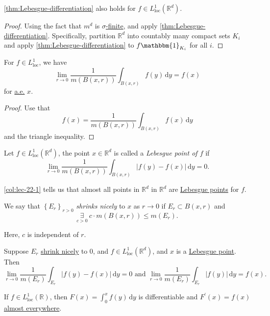 \begin{corollary}\label{col:lec-22-1}
	\autoref{thm:Lebesgue-differentiation} also holds for \(f\in L^1_{\text{loc}}(\mathbb{R} ^d)\).
\end{corollary}
\begin{proof}
	Using the fact that \(m^d\) is \hyperref[def:finite-measure]{\(\sigma \)-finite}, and apply \autoref{thm:Lebesgue-differentiation}.
	Specifically, partition \(\mathbb{R} ^d\) into countably many compact sets \(K_{i} \) and apply \autoref{thm:Lebesgue-differentiation}
	to \(f\mathbbm{1}_{K_{i} } \) for all \(i\).
\end{proof}

\begin{corollary}\label{col:lec-22-2}
	For \(f\in L^1_{\text{loc} }\), we have
	\[
		\lim_{r \to 0} \frac{1}{m(B(x, r))}\int_{B(x, r)}^{} f(y) \,\mathrm{d}y = f(x)
	\]
	for \hyperref[def:mu-almost-everywhere]{a.e.} \(x\).
\end{corollary}
\begin{proof}
	Use that
	\[
		f(x) = \frac{1}{m(B(x, r))}\int _{B(x, r)} f(x)\,\mathrm{d} y
	\]
	and the triangle inequality.
\end{proof}

\begin{definition}\label{def:Lebesgue-point}
	Let \(f\in L^1_{\text{loc}}(\mathbb{R} ^d)\), the point \(x\in \mathbb{R} ^d\) is called a \emph{Lebesgue point of \(f\)} if
	\[
		\lim_{r \to 0} \frac{1}{m(B(x, r))}\int _{B(x, r)}\left\vert f(y) - f(x) \right\vert \,\mathrm{d} y = 0.
	\]
\end{definition}
\begin{remark}
	\autoref{col:lec-22-1} tells us that almost all points in \(\mathbb{R} ^d\) in \(\mathbb{R} ^d\) are \hyperref[def:Lebesgue-point]{Lebesgue points}  for \(f\).
\end{remark}

\begin{definition}\label{def:shrink-nicely}
	We say that \(\left\{E_{r} \right\}_{r>0}\) \emph{shrinks nicely} to \(x\) as \(r\to 0\) if \(E_{r} \subset B(x, r)\) and
	\[
		\underset{c>0}{\exists } \ c\cdot m(B(x, r)) \leq m(E_{r} ).
	\]
\end{definition}
\begin{note}
	Here, \(c\) is independent of \(r\).
\end{note}

\begin{corollary}
	Suppose \(E_r\) \hyperref[def:shrink-nicely]{shrink nicely} to \(0\), and \(f\in L^1_{\text{loc}}(\mathbb{R} ^d)\), and \(x\) is a \hyperref[def:Lebesgue-point]{Lebesgue point}.
	Then
	\[
		\lim_{r \to 0} \frac{1}{m(E_{r} )} \int _{E_{r}}\left\vert f(y) - f(x) \right\vert \,\mathrm{d} y= 0\text{ and }
		\lim_{r \to 0} \frac{1}{m(E_{r} )} \int _{E_{r}}\left\vert f(y) \right\vert \,\mathrm{d} y= f(x).
	\]
\end{corollary}

\begin{corollary}
	If \(f\in L^1_{\text{loc} }(\mathbb{R} ) \), then \(F(x)= \int_{0}^x f(y)\,\mathrm{d} y\) is differentiable and \(F^\prime (x)=f(x)\) \hyperref[def:mu-almost-everywhere]{almost everywhere}.
\end{corollary}
